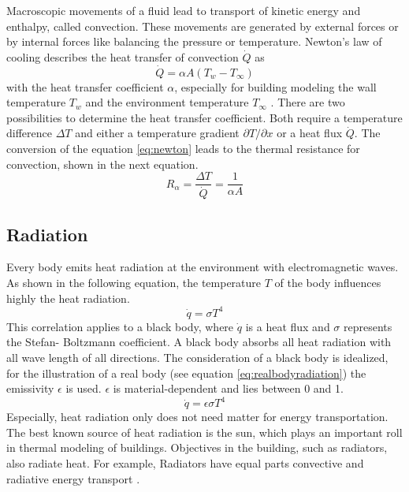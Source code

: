     Macroscopic movements of a fluid  lead to transport of kinetic energy and enthalpy, called convection. These movements are generated by external forces or by internal forces like balancing the pressure or temperature.\cite{.2013}
    \newline
    Newton's law of cooling describes the heat transfer of convection $\dot{Q}$ as 
    \begin{equation}
    \label{eq:newton}
        \dot{Q} = \alpha A (T_w - T_\infty)
    \end{equation}
    with the heat transfer coefficient $\alpha$, especially for building modeling the wall temperature $T_w$ and the environment temperature $T_\infty$ \cite{Griesinger.2019}
    . There are two possibilities to determine the heat transfer coefficient. Both require a temperature difference $\Delta T$ and either a temperature gradient $\partial T/\partial x$ or a heat flux $\dot{Q}$.
    \cite{.2013} 
    \newline
    The conversion of the equation \ref{eq:newton} leads to the thermal resistance for convection, shown in the next equation.\cite{Griesinger.2019}
    \begin{equation}
        R_\alpha = \frac{\Delta T}{\dot{Q}} = \frac{1}{\alpha A}
    \end{equation}

\subsection{Radiation}
\label{subsection:radiation}

    Every body emits heat radiation at the environment with electromagnetic waves. As shown in the following equation, the temperature $T$ of the body influences highly the heat radiation.\cite{.2013} 
    \begin{equation}
    \label{eq:radiation}
        \dot{q} = \sigma T^4
    \end{equation}
    This correlation applies to a black body, where $\dot{q}$ is a heat flux and $\sigma$ represents the Stefan- Boltzmann coefficient. A black body absorbs all heat radiation with all wave length of all directions\cite{Griesinger.2019}. The consideration of a black body is idealized, for the illustration of a real body (see equation \ref{eq:realbodyradiation}) the emissivity $\epsilon$ is used. $\epsilon$ is material-dependent and lies between 0 and 1.
    \begin{equation}
    \label{eq:realbodyradiation}
        \dot{q} = \epsilon \sigma T^4
    \end{equation}
    Especially, heat radiation only does not need matter for energy transportation.\cite{.2013}
    \newline
    The best known source of heat radiation is the sun, which plays an important roll in thermal modeling of buildings. Objectives in the building, such as radiators, also  radiate heat. For example, Radiators have equal parts convective and radiative energy transport \cite{Hazyuk.2012}. 
    
